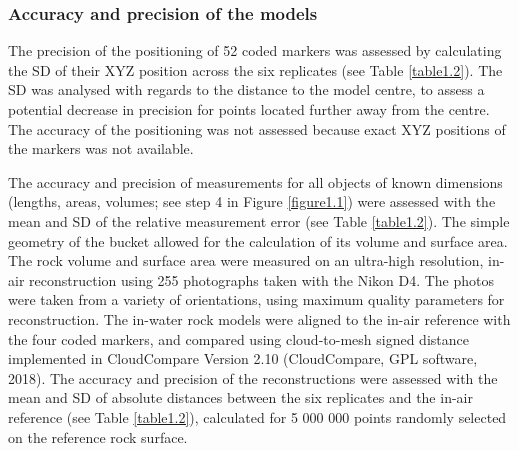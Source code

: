 \subsubsection{Accuracy and precision of the models}\label{chapitre1_2.3.3}
The precision of the positioning of 52 coded markers was assessed by calculating the SD of their XYZ position across the six replicates (see Table \ref{table1.2}). The SD was analysed with regards to the distance to the model centre, to assess a potential decrease in precision for points located further away from the centre. The accuracy of the positioning was not assessed because exact XYZ positions of the markers was not available.

The accuracy and precision of measurements for all objects of known dimensions (lengths, areas, volumes; see step 4 in Figure \ref{figure1.1}) were assessed with the mean and SD of the relative measurement error (see Table \ref{table1.2}). The simple geometry of the bucket allowed for the calculation of its volume and surface area. The rock volume and surface area were measured on an ultra-high resolution, in-air reconstruction \citep{bryson_characterization_2017} using 255 photographs taken with the Nikon D4. The photos were taken from a variety of orientations, using maximum quality parameters for reconstruction. The in-water rock models were aligned to the in-air reference with the four coded markers, and compared using cloud-to-mesh signed distance implemented in CloudCompare Version 2.10 (CloudCompare, GPL software, 2018). The accuracy and precision of the reconstructions were assessed with the mean and SD of absolute distances between the six replicates and the in-air reference (see Table \ref{table1.2}), calculated for 5 000 000 points randomly selected on the reference rock surface.

